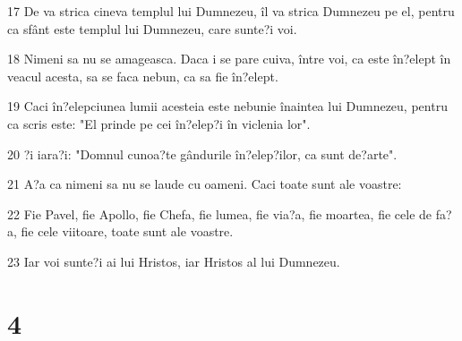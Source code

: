 \par 17 De va strica cineva templul lui Dumnezeu, îl va strica Dumnezeu pe el, pentru ca sfânt este templul lui Dumnezeu, care sunte?i voi.
\par 18 Nimeni sa nu se amageasca. Daca i se pare cuiva, între voi, ca este în?elept în veacul acesta, sa se faca nebun, ca sa fie în?elept.
\par 19 Caci în?elepciunea lumii acesteia este nebunie înaintea lui Dumnezeu, pentru ca scris este: "El prinde pe cei în?elep?i în viclenia lor".
\par 20 ?i iara?i: "Domnul cunoa?te gândurile în?elep?ilor, ca sunt de?arte".
\par 21 A?a ca nimeni sa nu se laude cu oameni. Caci toate sunt ale voastre:
\par 22 Fie Pavel, fie Apollo, fie Chefa, fie lumea, fie via?a, fie moartea, fie cele de fa?a, fie cele viitoare, toate sunt ale voastre.
\par 23 Iar voi sunte?i ai lui Hristos, iar Hristos al lui Dumnezeu.

\chapter{4}

